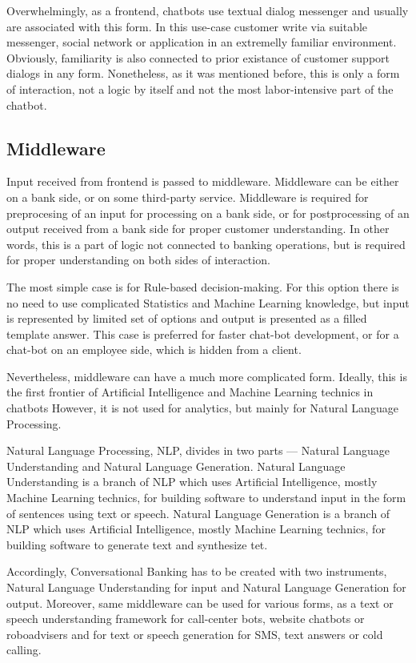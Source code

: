 Overwhelmingly, as a frontend, chatbots use textual dialog messenger and usually are associated with this form.
In this use-case customer write via suitable messenger, social network or application in an extremelly familiar environment.
Obviously, familiarity is also connected to prior existance of customer support dialogs in any form.
Nonetheless, as it was mentioned before, this is only a form of interaction, not a logic by itself and not the most labor-intensive part of the chatbot.


\subsection{Middleware}

Input received from frontend is passed to middleware.
Middleware can be either on a bank side, or on some third-party service.
Middleware is required for preprocesing of an input for processing on a bank side, or for postprocessing of an output received from a bank side for proper customer understanding.
In other words, this is a part of logic not connected to banking operations, but is required for proper understanding on both sides of interaction.

The most simple case is for Rule-based decision-making.
For this option there is no need to use complicated Statistics and Machine Learning knowledge, but input is represented by limited set of options and output is presented as a filled template answer.
This case is preferred for faster chat-bot development, or for a chat-bot on an employee side, which is hidden from a client. 

Nevertheless, middleware can have a much more complicated form.
Ideally, this is the first frontier of Artificial Intelligence and Machine Learning technics in chatbots
However, it is not used for analytics, but mainly for Natural Language Processing.

Natural Language Processing, NLP, divides in two parts — Natural Language Understanding and Natural Language Generation.
Natural Language Understanding is a branch of NLP which uses Artificial Intelligence, mostly Machine Learning technics, for building software to understand input in the form of sentences using text or speech.
Natural Language Generation is a branch of NLP which uses Artificial Intelligence, mostly Machine Learning technics, for building software to generate text and synthesize tet.

Accordingly, Conversational Banking has to be created with two instruments, Natural Language Understanding for input and Natural Language Generation for output.
Moreover, same middleware can be used for various forms, as a text or speech understanding framework for call-center bots, website chatbots or roboadvisers and for text or speech generation for SMS, text answers or cold calling.
 

